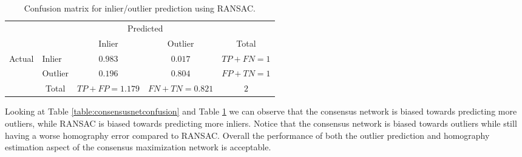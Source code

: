 \begin{table}[H]
	\centering
	\begin{tabular}{l|l|c|c|c}
		\multicolumn{2}{c}{}&\multicolumn{2}{c}{Predicted}&\\
		\cline{3-4}
		\multicolumn{2}{c|}{}&Inlier&Outlier&\multicolumn{1}{c}{Total}\\
		\cline{2-4}
		\multirow{2}{*}{Actual}& Inlier & $0.983$ & $0.017$ & $TP+FN=1$\\
		\cline{2-4}
		& Outlier & $0.196$ & $0.804$ & $FP+TN=1$\\
		\cline{2-4}
		\multicolumn{1}{c}{} & \multicolumn{1}{c}{Total} & \multicolumn{1}{c}{$TP+FP=1.179$} & \multicolumn{    1}{c}{$FN+TN=0.821$} & \multicolumn{1}{c}{$2$}\\
	\end{tabular}
	\caption{Confusion matrix for inlier/outlier prediction using RANSAC.}
	\label{table:ransacconfusion}
\end{table}

Looking at Table \ref{table:consensusnetconfusion} and Table \ref{table:ransacconfusion} we can observe that the consensus network is biased towards predicting more outliers, while RANSAC is biased towards predicting more inliers. Notice that the consensus network is biased towards outliers while still having a worse homography error compared to RANSAC. Overall the performance of both the outlier prediction and homography estimation aspect of the consensus maximization network is acceptable.


